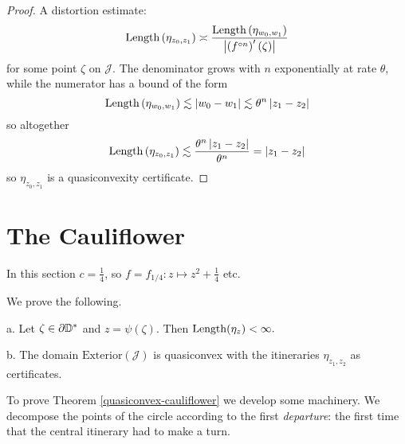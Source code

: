 \begin{proof}
A distortion estimate: 
\[
\operatorname{Length}\left(\eta_{z_{0},z_{1}}\right)\asymp\frac{\operatorname{Length}\left(\eta_{w_0,w_1}\right)}{\left|\left(f^{\circ n}\right)'\left(\zeta\right)\right|}
\]
 for some point $\zeta$ on $\mathcal{J}$. The denominator grows
with $n$ exponentially at rate $\theta$, while the numerator has
a bound of the form 
\[
\operatorname{Length}\left(\eta_{w_0,w_1}\right)\lesssim\left|w_0-w_1\right|\lesssim\theta^{n}\left|z_{1}-z_{2}\right|
\]
 so altogether 
\[
\operatorname{Length}\left(\eta_{z_{0},z_{1}}\right)\lesssim\frac{\theta^{n}\left|z_{1}-z_{2}\right|}{\theta^{n}}=\left|z_{1}-z_{2}\right|
\]
 so $\eta_{z_{0},z_{1}}$ is a quasiconvexity certificate.
\end{proof}

\section{The Cauliflower}
In this section $c=\frac 14$, so $f=f_{1/4}: z\mapsto z^2+ \frac 14$ etc.

We prove the following.

\begin{theorem} \label{quasiconvex-cauliflower}
	a. Let $\zeta\in\partial{\mathbb{D}^*}$ and $z=\psi(\zeta)$. Then 
$	\operatorname{Length}(\eta_z)<\infty.$
	
    b. The domain $\mathrm{Exterior}(\mathcal{J})$ is quasiconvex with the itineraries $\eta_{z_1,z_2}$ as certificates.
\end{theorem}

	\begin{comment}
Quantitatively, %
decompose the central itinerary into its constituent tracks $\eta_z = \gamma _1 +\gamma_2 +\ldots,$
then we have the bound $$
and decompose its central itinerary into tracks, 
$$\eta_\zeta = \gamma _1 +\gamma_2 +\ldots.$$
Then
$$\Length(\psi(\gamma_{k}))\lesssim\theta^{-k}$$ uniformly in
$\zeta$, for some constant $\theta=\theta(c)>1$.	
\end{comment}

To prove Theorem \ref{quasiconvex-cauliflower} we develop some machinery. We decompose the points of the circle according to 
the first \emph{departure}: the first time that the central itinerary had to make a turn.



